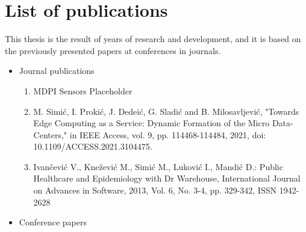 \chapter*{List of publications}
%
This thesis is the result of years of research and development, and it is based on the previously presented papers at conferences in journals.

\begin{itemize}
	
	\item Journal publications
	
	\begin{enumerate}[start=1,label={(\bfseries \arabic*)}]
		\item MDPI Sensors Placeholder
		\item M. Simić, I. Prokić, J. Dedeić, G. Sladić and B. Milosavljević, "Towards Edge Computing as a Service: Dynamic Formation of the Micro Data-Centers," in IEEE Access, vol. 9, pp. 114468-114484, 2021, doi: 10.1109/ACCESS.2021.3104475.
		\item  Ivančević V., Knežević M., Simić M., Luković I., Mandić D.:  Public Healthcare and Epidemiology with Dr Warehouse, International Journal on Advances in Software, 2013, Vol. 6, No. 3-4, pp. 329-342, ISSN 1942-2628
	\end{enumerate}
	
	\item Conference papers
	

\end{itemize}
